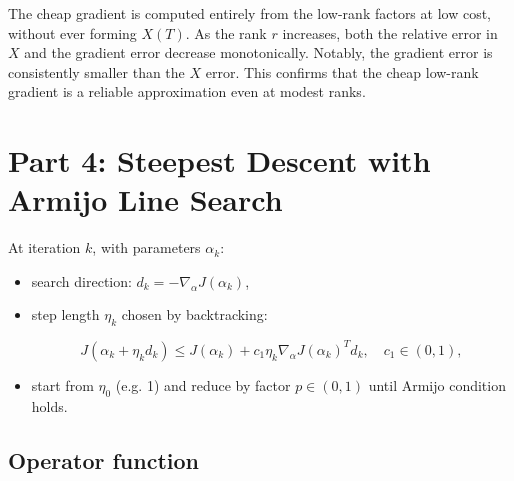 \documentclass[11pt]{report}
\begin{document}
The cheap gradient is computed entirely from the low-rank factors at low cost, without ever forming $X(T)$. As the rank $r$ increases, both the relative error in $X$ and the gradient error decrease monotonically. Notably, the gradient error is consistently smaller than the $X$ error. This confirms that the cheap low-rank gradient is a reliable approximation even at modest ranks.

\section{Part 4: Steepest Descent with Armijo Line Search}

At iteration \(k\), with parameters \(\alpha_k\):
\begin{itemize}[leftmargin=*]
    \item search direction: \(d_k = -\nabla_\alpha J(\alpha_k)\),
    \item step length \(\eta_k\) chosen by backtracking:
    

\[
    J(\alpha_k + \eta_k d_k)
    \le J(\alpha_k) + c_1 \eta_k \nabla_\alpha J(\alpha_k)^T d_k,\quad c_1\in(0,1),
    \]


    \item start from \(\eta_0\) (e.g. 1) and reduce by factor \(p\in(0,1)\) until Armijo condition holds.
\end{itemize}

\subsection{Operator function}
\end{document}
